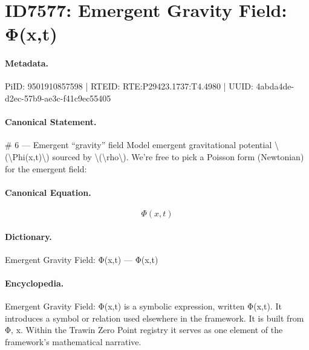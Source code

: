 \section*{ID7577: Emergent Gravity Field: Φ(x,t)}
\paragraph{Metadata.}
PiID: 9501910857598 | RTEID: RTE:P29423.1737:T4.4980 | UUID: 4abda4de-d2ec-57b9-ae3c-f41c9ec55405

\paragraph{Canonical Statement.}
\# 6 — Emergent “gravity” field Model emergent gravitational potential \textbackslash{}(\textbackslash{}Phi(x,t)\textbackslash{}) sourced by \textbackslash{}(\textbackslash{}rho\textbackslash{}). We’re free to pick a Poisson form (Newtonian) for the emergent field:

\paragraph{Canonical Equation.}
\[
\Phi(x,t)
\]

\paragraph{Dictionary.}
Emergent Gravity Field: Φ(x,t) — Φ(x,t)

\paragraph{Encyclopedia.}
Emergent Gravity Field: Φ(x,t) is a symbolic expression, written Φ(x,t). It introduces a symbol or relation used elsewhere in the framework. It is built from Φ, x. Within the Trawin Zero Point registry it serves as one element of the framework's mathematical narrative.
